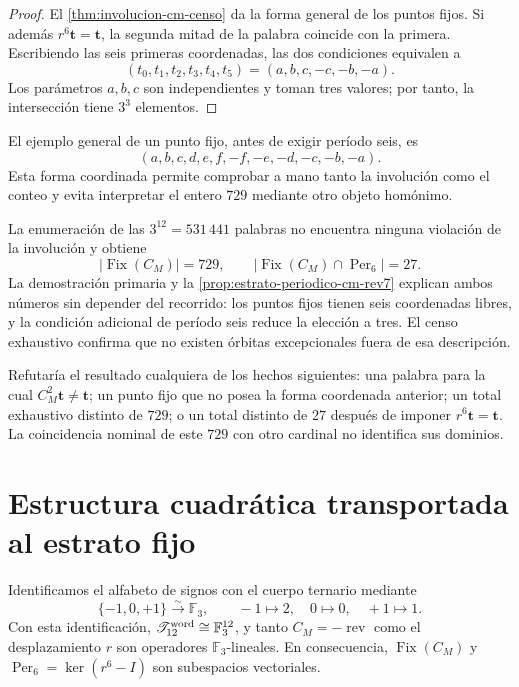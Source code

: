 \begin{proof}
El \cref{thm:involucion-cm-censo} da la forma general de los puntos fijos.
Si además \(r^6\mathbf t=\mathbf t\), la segunda mitad de la palabra coincide
con la primera. Escribiendo las seis primeras coordenadas, las dos
condiciones equivalen a
\[
 (t_0,t_1,t_2,t_3,t_4,t_5)
 =(a,b,c,-c,-b,-a).
\]
Los parámetros \(a,b,c\) son independientes y toman tres valores; por tanto,
la intersección tiene \(3^3\) elementos.
\end{proof}

El ejemplo general de un punto fijo, antes de exigir período seis, es
\[
 (a,b,c,d,e,f,-f,-e,-d,-c,-b,-a).
\]
Esta forma coordinada permite comprobar a mano tanto la involución como el
conteo y evita interpretar el entero \(729\) mediante otro objeto homónimo.

\begin{remark}
\label{rem:procedencia-n40-cm}
La enumeración de las \(3^{12}=531\,441\) palabras no encuentra ninguna
violación de la involución y obtiene
\[
 |\operatorname{Fix}(C_M)|=729,
 \qquad
 |\operatorname{Fix}(C_M)\cap\operatorname{Per}_6|=27.
\]
La demostración primaria y la \cref{prop:estrato-periodico-cm-rev7} explican
ambos números sin depender del recorrido: los puntos fijos tienen seis
coordenadas libres, y la condición adicional de período seis reduce la
elección a tres. El censo exhaustivo confirma que no
existen órbitas excepcionales fuera de esa descripción.
\end{remark}

\begin{criterion}
\label{crit:falsadores-cm}
Refutaría el resultado cualquiera de los hechos siguientes: una palabra para
la cual \(C_M^2\mathbf t\ne\mathbf t\); un punto fijo que no posea la forma
coordenada anterior; un total exhaustivo distinto de \(729\); o un total
distinto de \(27\) después de imponer \(r^6\mathbf t=\mathbf t\). La
coincidencia nominal de este \(729\) con otro cardinal no identifica sus
dominios.
\end{criterion}

\section{Estructura cuadrática transportada al estrato fijo}
\label{sec:estructura-cuadratica-estrato-fijo-cm}

Identificamos el alfabeto de signos con el cuerpo ternario mediante
\[
 \{-1,0,+1\}\xrightarrow{\sim}\mathbb F_3,
 \qquad
 -1\longmapsto2,\quad 0\longmapsto0,\quad +1\longmapsto1.
\]
Con esta identificación,
\(\mathscr T_{12}^{\rm word}\cong\mathbb F_3^{12}\), y tanto
\(C_M=-\operatorname{rev}\) como el desplazamiento \(r\) son operadores
\(\mathbb F_3\)-lineales. En consecuencia,
\(\operatorname{Fix}(C_M)\) y
\(\operatorname{Per}_6=\ker(r^6-I)\) son subespacios vectoriales.

